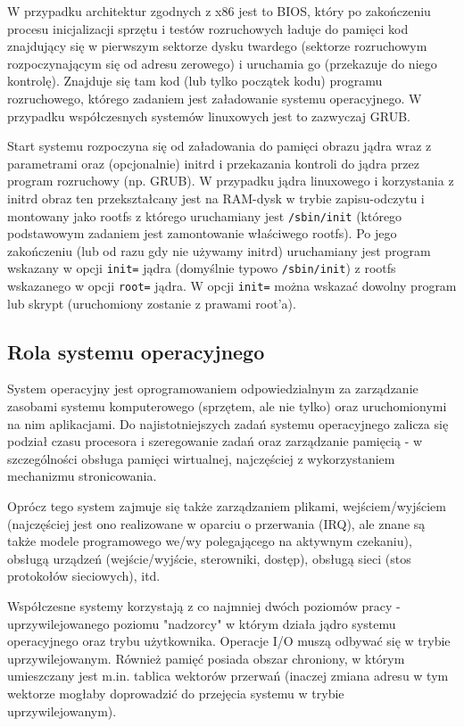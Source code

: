 W przypadku architektur zgodnych z x86 jest to BIOS, który po zakończeniu procesu inicjalizacji sprzętu i testów rozruchowych ładuje do pamięci kod znajdujący się w pierwszym sektorze dysku twardego (sektorze rozruchowym rozpoczynającym się od adresu zerowego) i uruchamia go (przekazuje do niego kontrolę). Znajduje się tam kod (lub tylko początek kodu) programu rozruchowego, którego zadaniem jest załadowanie systemu operacyjnego. W przypadku współczesnych systemów linuxowych jest to zazwyczaj GRUB.

Start systemu rozpoczyna się od załadowania do pamięci obrazu jądra wraz z parametrami oraz (opcjonalnie) initrd i przekazania kontroli do jądra przez program rozruchowy (np. GRUB). W przypadku jądra linuxowego i korzystania z initrd obraz ten przekształcany jest na RAM-dysk w trybie zapisu-odczytu i montowany jako rootfs z którego uruchamiany jest \Verb#/sbin/init# (którego podstawowym zadaniem jest zamontowanie właściwego rootfs). Po jego zakończeniu (lub od razu gdy nie używamy initrd) uruchamiany jest program wskazany w opcji \Verb#init=# jądra (domyślnie typowo \Verb#/sbin/init#) z rootfs wskazanego w opcji \Verb#root=# jądra. W opcji \Verb#init=# można wskazać dowolny program lub skrypt (uruchomiony zostanie z prawami root'a).

\subsection{Rola systemu operacyjnego}

System operacyjny jest oprogramowaniem odpowiedzialnym za zarządzanie zasobami systemu komputerowego (sprzętem, ale nie tylko) oraz uruchomionymi na nim aplikacjami. Do najistotniejszych zadań systemu operacyjnego zalicza się podział czasu procesora i szeregowanie zadań oraz zarządzanie pamięcią - w szczególności obsługa pamięci wirtualnej, najczęściej z wykorzystaniem mechanizmu stronicowania.

Oprócz tego system zajmuje się także zarządzaniem plikami, wejściem/wyjściem (najczęściej jest ono realizowane w oparciu o przerwania (IRQ), ale znane są także modele programowego we/wy polegającego na aktywnym czekaniu), obsługą urządzeń (wejście/wyjście, sterowniki, dostęp), obsługą sieci (stos protokołów sieciowych), itd.

Współczesne systemy korzystają z co najmniej dwóch poziomów pracy - uprzywilejowanego poziomu "nadzorcy" w którym działa jądro systemu operacyjnego oraz trybu użytkownika. Operacje I/O muszą odbywać się w trybie uprzywilejowanym. Również pamięć posiada obszar chroniony, w którym umieszczany jest m.in. tablica wektorów przerwań (inaczej zmiana adresu w tym wektorze mogłaby doprowadzić do przejęcia systemu w trybie uprzywilejowanym).

